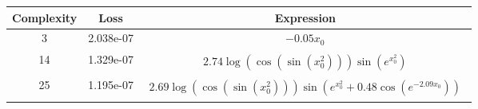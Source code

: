 \begin{center}
        \begin{tabular}{|c|c|c|}
        \hline
        Complexity & Loss & Expression \\
        \hline
        3 & 2.038e-07 & $\begin{aligned}- 0.05 x_{0}\end{aligned}$\\ \hline14 & 1.329e-07 & $\begin{aligned}2.74 \log{\left(\cos{\left(\sin{\left(x_{0}^{2} \right)} \right)} \right)} \sin{\left(e^{x_{0}^{2}} \right)}\end{aligned}$\\ \hline25 & 1.195e-07 & $\begin{aligned}2.69 \log{\left(\cos{\left(\sin{\left(x_{0}^{2} \right)} \right)} \right)} \sin{\left(e^{x_{0}^{2}} + 0.48 \cos{\left(e^{- 2.09 x_{0}} \right)} \right)}\end{aligned}$\\ \hline\end{tabular}
        \end{center}
        